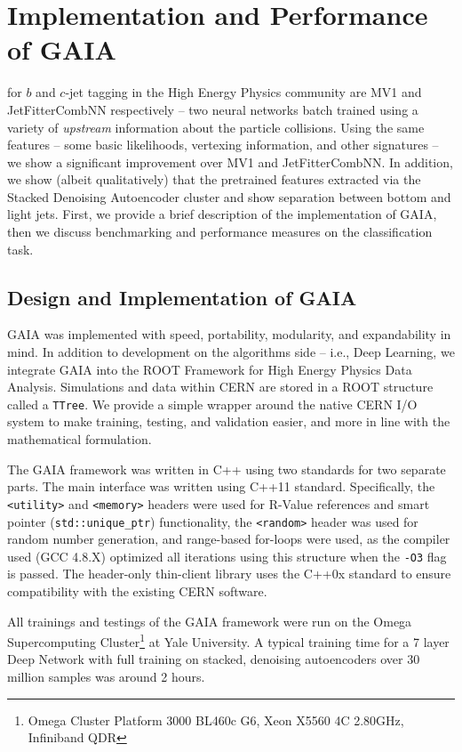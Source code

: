 \chapter{Implementation and Performance of GAIA}
 for $b$ and $c$-jet tagging in the High Energy Physics community are MV1 and JetFitterCombNN respectively -- two neural networks batch trained using a variety of \emph{upstream} information about the particle collisions. Using the same features -- some basic likelihoods, vertexing information, and other signatures -- we show a significant improvement over MV1 and JetFitterCombNN. In addition, we show (albeit qualitatively) that the pretrained features extracted via the Stacked Denoising Autoencoder cluster and show separation between bottom and light jets. First, we provide a brief description of the implementation of GAIA, then we discuss benchmarking and performance measures on the classification task.

\section{Design and Implementation of GAIA}
GAIA was implemented with speed, portability, modularity, and expandability in mind. In addition to development on the algorithms side -- i.e., Deep Learning, we integrate GAIA into the ROOT \citep{ROOT} Framework for High Energy Physics Data Analysis. Simulations and data within CERN are stored in a ROOT structure called a \texttt{TTree}. We provide a simple wrapper around the native CERN I/O system to make training, testing, and validation easier, and more in line with the mathematical formulation.

The GAIA framework was written in C++ using two standards for two separate parts. The main interface was written using C++11 standard. Specifically, the \texttt{<utility>} and \texttt{<memory>} headers were used for R-Value references and smart pointer (\texttt{std::unique\_{}ptr}) functionality, the \texttt{<random>} header was used for random number generation, and range-based for-loops were used, as the compiler used (GCC 4.8.X) optimized all iterations using this structure when the \texttt{-O3} flag is passed. The header-only thin-client library uses the C++0x standard to ensure compatibility with the existing CERN software.

All trainings and testings of the GAIA framework were run on the Omega Supercomputing Cluster\footnote{Omega Cluster Platform 3000 BL460c G6, Xeon X5560 4C 2.80GHz, Infiniband QDR} at Yale University. A typical training time for a 7 layer Deep Network with full training on stacked, denoising autoencoders over 30 million samples was around 2 hours. 

